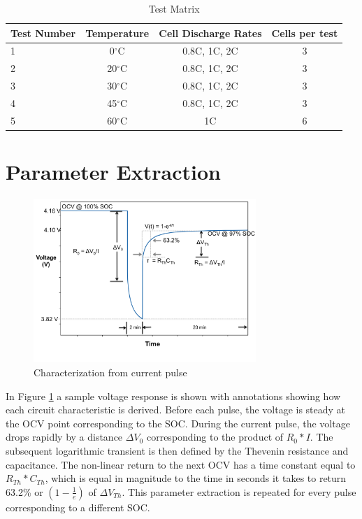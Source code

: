 \documentclass[]{aiaa-tc}%
\begin{document}
\begin{table}[ht]
\begin{center}
\begin{tabular}{|l|c|c|c|}
\hline
 \multicolumn{1}{|c|}{\textbf{Test Number}} &
 \multicolumn{1}{c|}{\textbf{Temperature}} & 
 \multicolumn{1}{c|}{\textbf{Cell Discharge Rates}} &
 \multicolumn{1}{c|}{\textbf{Cells per test}} \\ 
\hline
\rowcolor{LightCyan}
1  & 0$^\circ$C & 0.8C, 1C, 2C & 3 \\
2  & 20$^\circ$C & 0.8C, 1C, 2C & 3 \\
\rowcolor{LightCyan}
3  & 30$^\circ$C & 0.8C, 1C, 2C & 3 \\
4  & 45$^\circ$C & 0.8C, 1C, 2C & 3 \\
\rowcolor{LightCyan}
5  & 60$^\circ$C & 1C & 6 \\

\hline
\end{tabular}
\end{center}
\label{tab:battTestM}
\caption{Test Matrix}
\end{table}


\section{Parameter Extraction}

\begin{figure}[!htb]
	\centering
	\includegraphics[width=0.75\textwidth]{figures/Batt_Char.png}
	\caption{Characterization from current pulse}
	\label{fig:BattChar}
\end{figure}

In Figure \ref{fig:BattChar} a sample voltage response is shown with annotations showing how each circuit characteristic is derived. Before each pulse, the voltage is steady at the OCV point corresponding to the SOC. During the current pulse, the voltage drops rapidly by a distance $\Delta V_{0}$ corresponding to the product of $R_{0}*I$. The subsequent logarithmic transient is then defined by the Thevenin resistance and capacitance. The non-linear return to the next OCV has a time constant equal to $R_{Th}*C_{Th}$, which is equal in magnitude to the time in seconds it takes to return 63.2\% or $(1-\frac{1}{e})$ of $\Delta V_{Th}$. This parameter extraction is repeated for every pulse corresponding to a different SOC.
\end{document}
